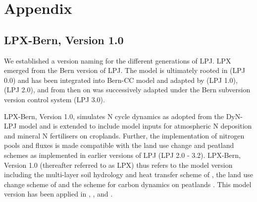 \chapter{Appendix}



\section{LPX-Bern, Version 1.0}
\label{sec:app.lpx}
We established a version naming for the different generations of LPJ. LPX emerged from the Bern version of LPJ. The model is ultimately rooted in \cite{sitch03gcb} (LPJ 0.0) and has been integrated into Bern-CC model and adapted by \cite{gerber03diss} (LPJ 1.0), \cite{strassmann08diss} (LPJ 2.0), and from then on was successively adapted under the Bern subversion version control system (LPJ 3.0).

LPX-Bern, Version 1.0, simulates N cycle dynamics as adopted from the DyN-LPJ model \citep{xuri08gcb} and is extended to include model inputs for atmospheric N deposition and mineral N fertilisers on croplands. Further, the implementation of nitrogen pools and fluxes is made compatible with the land use change and peatland schemes as implemented in earlier versions of LPJ (LPJ 2.0 - 3.2). LPX-Bern, Version 1.0 (thereafter referred to as LPX) thus refers to the model version including the multi-layer soil hydrology and heat transfer scheme of \citet{wania09gbca, spahni11bg}, the land use change scheme of \citet{strassmann08tel} and the scheme for carbon dynamics on peatlands \citep{wania09gbca}. This model version has been applied in \citet{stocker13natcc}, \citet{spahni13cp}, and \citet{lequere13essd}.


